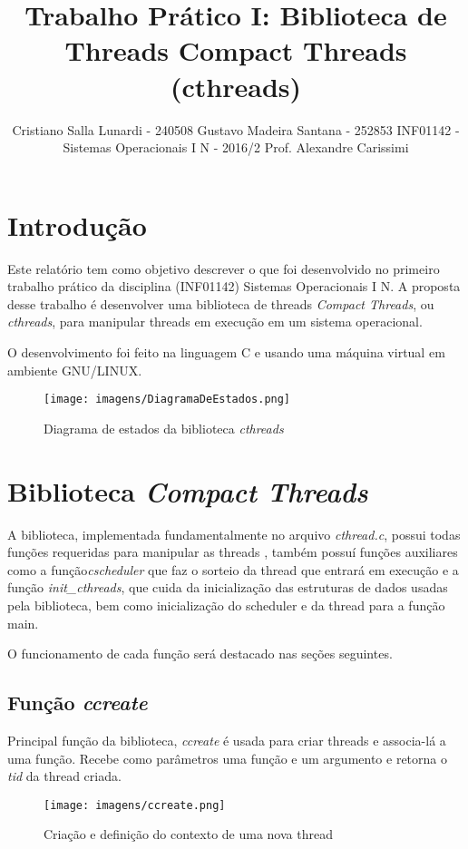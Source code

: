 \documentclass{article}
\title{Trabalho Prático I: Biblioteca de Threads Compact Threads (cthreads)}
\author{Cristiano Salla Lunardi - 240508 \cr
Gustavo Madeira Santana - 252853 \cr\cr
INF01142 - Sistemas Operacionais I N - 2016/2\cr\cr
Prof. Alexandre Carissimi}
\date{}
\begin{document}
\maketitle

\section{Introdução}
Este relatório tem como objetivo descrever o que foi desenvolvido no primeiro trabalho prático da disciplina (INF01142) Sistemas Operacionais I N. A proposta desse trabalho é desenvolver uma biblioteca de threads \textit{Compact Threads}, ou \textit{cthreads}, para manipular threads em execução em um sistema operacional.

O desenvolvimento foi feito na linguagem C e usando uma máquina virtual em ambiente GNU/LINUX.

\begin{figure}[b]
    \centering
    \texttt{[image: imagens/DiagramaDeEstados.png]}
    \caption{Diagrama de estados da biblioteca \textit{cthreads}}
    \label{fig:sym4}
\end{figure}

\section{Biblioteca \textit{Compact Threads}}
A biblioteca, implementada fundamentalmente no arquivo \textit{cthread.c}, possui todas funções requeridas para manipular as threads \footnotemark, também possuí funções auxiliares como a função\textit{cscheduler} que faz o sorteio da thread que entrará em execução e a função \textit{init\_cthreads}, que cuida da inicialização das estruturas de dados usadas pela biblioteca, bem como inicialização do scheduler e da thread para a função main.

O funcionamento de cada função será destacado nas seções seguintes.

\subsection{Função \textit{ccreate}}
Principal função da biblioteca, \textit{ccreate} é usada para criar threads e associa-lá a uma função. Recebe como parâmetros uma função e um argumento e retorna o \textit{tid} da thread criada.

\begin{figure}[h]
    \centering
    \texttt{[image: imagens/ccreate.png]}
    \caption{Criação e definição do contexto de uma nova thread}
    \label{fig:sym4}
\end{figure}
\end{document}
